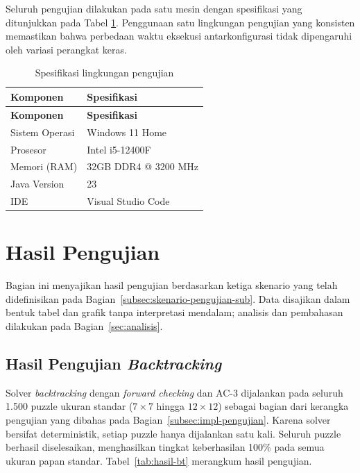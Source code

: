 Seluruh pengujian dilakukan pada satu mesin dengan spesifikasi yang ditunjukkan pada Tabel \ref{tab:lingkungan}. Penggunaan satu lingkungan pengujian yang konsisten memastikan bahwa perbedaan waktu eksekusi antarkonfigurasi tidak dipengaruhi oleh variasi perangkat keras.

\begin{longtable}{ll}
	\caption{Spesifikasi lingkungan pengujian}
	\label{tab:lingkungan} \\
	\toprule
	\textbf{Komponen} & \textbf{Spesifikasi} \\
	\midrule
	\endfirsthead
	\toprule
	\textbf{Komponen} & \textbf{Spesifikasi} \\
	\midrule
	\endhead
	\bottomrule
	\endfoot
	Sistem Operasi & Windows 11 Home \\
	\midrule
	Prosesor & Intel i5-12400F \\
	\midrule
	Memori (RAM) & 32GB DDR4 @ 3200 MHz \\
	\midrule
	Java Version & 23 \\
	\midrule
	IDE & Visual Studio Code \\
	\bottomrule
\end{longtable}

\section{Hasil Pengujian}
\label{sec:hasil-pengujian}

Bagian ini menyajikan hasil pengujian berdasarkan ketiga skenario yang telah didefinisikan pada Bagian~\ref{subsec:skenario-pengujian-sub}. Data disajikan dalam bentuk tabel dan grafik tanpa interpretasi mendalam; analisis dan pembahasan dilakukan pada Bagian~\ref{sec:analisis}.

\subsection{Hasil Pengujian \textit{Backtracking}}
\label{subsec:hasil-backtracking}

Solver \textit{backtracking} dengan \textit{forward checking} dan AC-3 dijalankan pada seluruh 1.500 puzzle ukuran standar ($7 \times 7$ hingga $12 \times 12$) sebagai bagian dari kerangka pengujian yang dibahas pada Bagian~\ref{subsec:impl-pengujian}. Karena solver bersifat deterministik, setiap puzzle hanya dijalankan satu kali. Seluruh puzzle berhasil diselesaikan, menghasilkan tingkat keberhasilan 100\% pada semua ukuran papan standar. Tabel~\ref{tab:hasil-bt} merangkum hasil pengujian.

